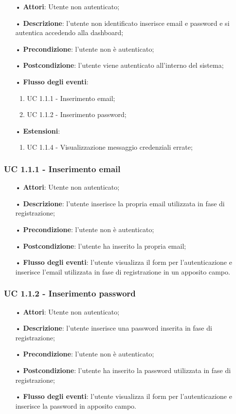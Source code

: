 \begin{itemize}
\item[•]\textbf{Attori}: Utente non autenticato;
\item[•]\textbf{Descrizione}:  l’utente non identificato inserisce email e password e si autentica accedendo alla dashboard;
\item[•]\textbf{Precondizione}: l’utente non è autenticato;
\item[•]\textbf{Postcondizione}: l’utente viene autenticato all’interno del sistema;
\item[•]\textbf{Flusso degli eventi}:
\begin{enumerate}
\item UC 1.1.1 - Inserimento email;
\item UC 1.1.2 - Inserimento password;

\end{enumerate}
\item[•]\textbf{Estensioni}:
\begin{enumerate}
\item UC 1.1.4 - Visualizzazione messaggio credenziali errate;
\end{enumerate}
\end{itemize}

\subsubsection{UC 1.1.1 - Inserimento email}
\begin{itemize}
\item[•]\textbf{Attori}: Utente non autenticato;
\item[•]\textbf{Descrizione}: l’utente inserisce la propria email utilizzata in fase di registrazione;
\item[•]\textbf{Precondizione}: l’utente non è autenticato;
\item[•]\textbf{Postcondizione}: l’utente ha inserito la propria email;
\item[•]\textbf{Flusso degli eventi}: l'utente visualizza il form per l'autenticazione e inserisce l'email utilizzata in fase di registrazione in un apposito campo.

\end{itemize}

\subsubsection{UC 1.1.2 - Inserimento password}
\begin{itemize}
\item[•]\textbf{Attori}: Utente non autenticato;
\item[•]\textbf{Descrizione}: l’utente inserisce una password inserita in fase di registrazione;
\item[•]\textbf{Precondizione}: l'utente non è autenticato;
\item[•]\textbf{Postcondizione}: l'utente ha inserito la password utilizzata in fase di registrazione;
\item[•]\textbf{Flusso degli eventi}: l'utente visualizza il form per l'autenticazione e inserisce la password in apposito campo.
\end{itemize}

